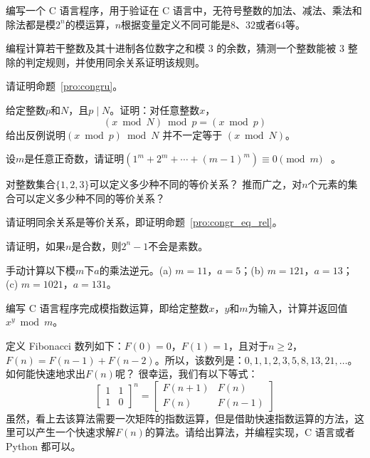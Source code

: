 \begin{problemset}

  \item 编写一个 C 语言程序，用于验证在 C 语言中，无符号整数的加法、减法、乘法和除法都是模$2^n$的模运算，$n$根据变量定义不同可能是$8$、$32$或者$64$等。
  
  \item 编程计算若干整数及其十进制各位数字之和模 $3$ 的余数，猜测一个整数能被 $3$ 整除的判定规则，并使用同余关系证明该规则。%
  
  \item 请证明命题~\ref{pro:congru}。
  
  \item 给定整数$p$和$N$，且$p \mid N$。证明：对任意整数$x$，
  \[ (x \bmod N) \bmod p = (x \bmod p)\]
  给出反例说明$(x \bmod p) \bmod N$ 并不一定等于 $(x \bmod N)$。
  
  \item 设$m$是任意正奇数，请证明$(1^m + 2^m + \cdots + (m-1)^m) \equiv 0 \pmod{m} $ ~\cite{Wei79}。
  
  \item 对整数集合$\{1, 2, 3\}$可以定义多少种不同的等价关系？%
  推而广之，对$n$个元素的集合可以定义多少种不同的等价关系？%
  
  \item 请证明同余关系是等价关系，即证明命题~\ref{pro:congr_eq_rel}。
  
  \item 请证明，如果$n$是合数，则$2^n - 1$不会是素数。
  
  \item 手动计算以下模$m$下$a$的乘法逆元。(a) $m = 11$，$a = 5$；(b) $m = 121$，$a = 13$；(c) $m = 1021$，$a = 131$。 
 
   \item 编写 C 语言程序完成模指数运算，即给定整数$x$，$y$和$m$为输入，计算并返回值$x^y \bmod m$。
 
   \item 定义 Fibonacci 数列如下：$F(0)=0$，$F(1)=1$，且对于$n \geq 2$，$F(n)=F(n-1)+F(n-2)$。所以，该数列是：$0, 1, 1, 2, 3, 5, 8, 13, 21, \dots$。如何能快速地求出$F(n)$呢？
   很幸运，我们有以下等式：
   $$\begin{bmatrix} 1 & 1\\ 1 & 0 \end{bmatrix}^n = \begin{bmatrix} F(n+1) & F(n)\\ F(n) & F(n-1) \end{bmatrix}$$
   虽然，看上去该算法需要一次矩阵的指数运算，但是借助快速指数运算的方法，这里可以产生一个快速求解$F(n)$的算法。请给出算法，并编程实现，C 语言或者 Python 都可以。
 

\end{problemset}
